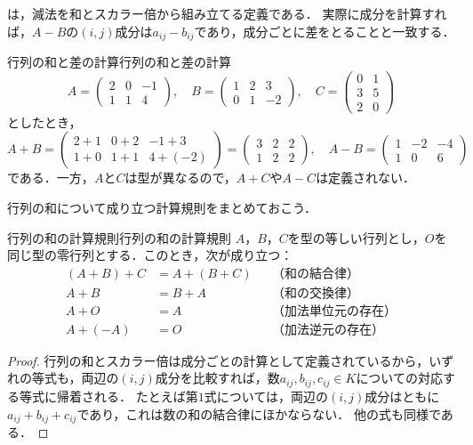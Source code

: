は，減法を和とスカラー倍から組み立てる定義である．
実際に成分を計算すれば，$A - B$の$(i, j)$成分は$a_{ij} - b_{ij}$であり，成分ごとに差をとることと一致する．

\begin{example}{行列の和と差の計算}{行列の和と差の計算}
  \[
    A = \begin{pmatrix} 2 & 0 & -1 \\ 1 & 1 & 4 \end{pmatrix}, \quad
    B = \begin{pmatrix} 1 & 2 & 3 \\ 0 & 1 & -2 \end{pmatrix}, \quad
    C = \begin{pmatrix} 0 & 1 \\ 3 & 5 \\ 2 & 0 \end{pmatrix}
  \]
  としたとき，
  \[
    A + B =
    \begin{pmatrix}
      2 + 1 & 0 + 2 & -1 + 3 \\
      1 + 0 & 1 + 1 & 4 + (-2)
    \end{pmatrix}
    =
    \begin{pmatrix}
      3 & 2 & 2 \\
      1 & 2 & 2
    \end{pmatrix}, \quad
    A - B =
    \begin{pmatrix}
      1 & -2 & -4 \\
      1 & 0 & 6
    \end{pmatrix}
  \]
  \tcbbreak
  \noindent 
  である．一方，$A$と$C$は型が異なるので，$A + C$や$A - C$は定義されない．
\end{example}

行列の和について成り立つ計算規則をまとめておこう．

\begin{prop}{行列の和の計算規則}{行列の和の計算規則}
  $A$，$B$，$C$を型の等しい行列とし，$O$を同じ型の零行列とする．このとき，次が成り立つ：
  \begin{align*}
    (A + B) + C &= A + (B + C) && \text{（和の結合律）} \\
    A + B &= B + A && \text{（和の交換律）} \\
    A + O &= A && \text{（加法単位元の存在）} \\
    A + (-A) &= O && \text{（加法逆元の存在）}
  \end{align*}
\end{prop}

\begin{tleftbar}
\begin{proof}
  行列の和とスカラー倍は成分ごとの計算として定義されているから，いずれの等式も，両辺の$(i, j)$成分を比較すれば，数$a_{ij}, b_{ij}, c_{ij} \in K$についての対応する等式に帰着される．
  たとえば第$1$式については，両辺の$(i, j)$成分はともに$a_{ij} + b_{ij} + c_{ij}$であり，これは数の和の結合律にほかならない．
  他の式も同様である．
\end{proof}
\end{tleftbar}

